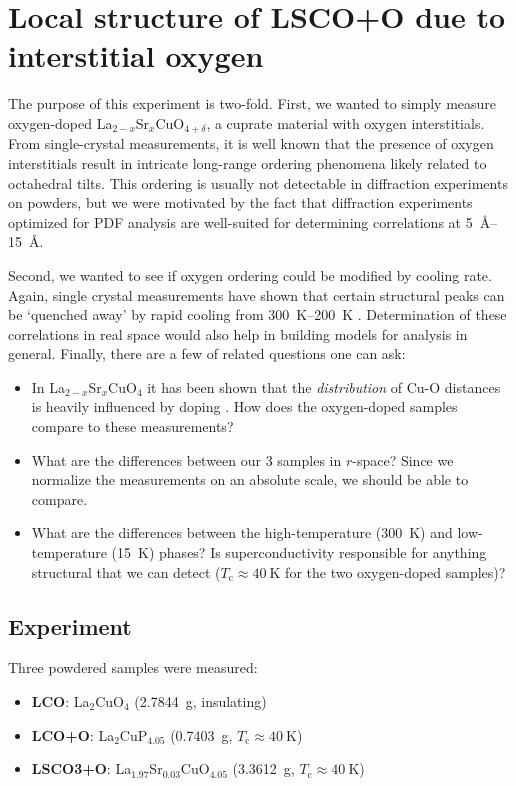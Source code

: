 \chapter{Local structure of LSCO+O due to interstitial oxygen}

 The purpose of this experiment is two-fold. First, we wanted to simply measure oxygen-doped La$_{2-x}$Sr$_x$CuO$_{4+\delta}$, a cuprate material with oxygen interstitials. From single-crystal measurements, it is well known that the presence of oxygen interstitials result in intricate long-range ordering phenomena likely related to octahedral tilts. This ordering is usually not detectable in diffraction experiments on powders, but we were motivated by the fact that diffraction experiments optimized for PDF analysis are well-suited for determining correlations at \SIrange{5}{15}{\angstrom}.

Second, we wanted to see if oxygen ordering could be modified by cooling rate. Again, single crystal measurements have shown that certain structural peaks can be `quenched away' by rapid cooling from \SIrange{300}{200}{\kelvin} \cite{Poccia2012}. Determination of these correlations in real space would also help in building models for analysis in general. Finally, there are a few of related questions one can ask:

\begin{itemize}
    \item In La$_{2-x}$Sr$_x$CuO$_4$ it has been shown that the \emph{distribution} of Cu-O distances is heavily influenced by doping \cite{Bozin2000}. How does the oxygen-doped samples compare to these measurements?
    \item What are the differences between our 3 samples in $r$-space? Since we normalize the measurements on an absolute scale, we should be able to compare.
    \item What are the differences between the high-temperature (\SI{300}{\kelvin}) and low-temperature (\SI{15}{\kelvin}) phases? Is superconductivity responsible for anything structural that we can detect ($T_\text{c} \approx \SI{40}{\kelvin}$ for the two oxygen-doped samples)?
\end{itemize}

\section{Experiment}
Three powdered samples were measured:

\begin{itemize}
    \item \textbf{LCO}: La$_2$CuO$_4$ (\SI{2.7844}{\gram}, insulating)
    \item \textbf{LCO+O}: La$_2$CuP$_{4.05}$ (\SI{0.7403}{\gram}, $T_\text{c} \approx \SI{40}{\kelvin}$)
    \item \textbf{LSCO3+O}: La$_{1.97}$Sr$_{0.03}$CuO$_{4.05}$ (\SI{3.3612}{\gram}, $T_\text{c} \approx \SI{40}{\kelvin}$)
\end{itemize}

